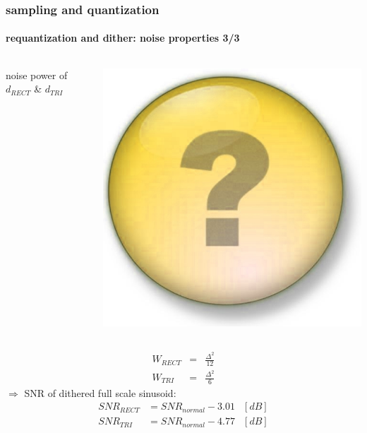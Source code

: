 	\begin{frame}\frametitle{sampling and quantization}\framesubtitle{requantization and dither: noise properties 3/3}
		\vspace{-15mm}
		\begin{columns}
			noise power of $d_{RECT}$ \& $d_{TRI}$
			
			\begin{flushright}
				 \includegraphics[scale=.08]{Graph/question-mark}
			\end{flushright}
		\end{columns}
		\pause
		\begin{eqnarray}
			W_{RECT} &=& \frac{\Delta^2}{12}\\
			W_{TRI} &=& \frac{\Delta^2}{6}
		\end{eqnarray}
		\pause
		$\Rightarrow$ SNR of dithered full scale sinusoid:
		\begin{eqnarray}
			SNR_{RECT} 	&= SNR_{normal} - 3.01 &[dB] \\
			SNR_{TRI} 	&= SNR_{normal} - 4.77 &[dB] 
		\end{eqnarray}

	\end{frame}	
